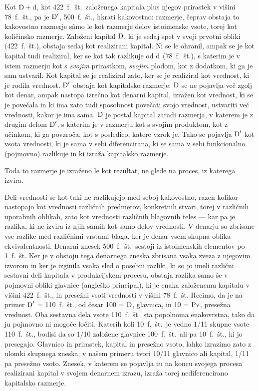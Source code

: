 \documentclass[kapital_02.tex]{subfiles}
\begin{document}
Kot \( \textrm{D} + \textrm{d} \), kot 422~f.~št.\ založenega kapitala plus njegov prirastek v višini 78~f.~št., pa je \( \textrm{D}' \), 500~f.~št., hkrati kakovostno: razmerje, čeprav obstaja to kakovostno razmerje s\^amo le kot razmerje delov istoimenske vsote, torej kot količinsko razmerje. Založeni kapital \( \textrm{D} \), ki je sedaj spet v svoji prvotni obliki (422~f.~št.), obstaja sedaj kot realizirani kapital. Ni se le ohranil, ampak se je kot kapital tudi realiziral, ker se kot tak razlikuje od \( \textrm{d} \) (78~f.~št.), s katerim je v istem razmerju kot s \emph{svojim} prirastkom, \emph{svojim} plodom, kot z dodatkom, ki ga je sam ustvaril. Kot kapital se je realiziral zato, ker se je realiziral kot vrednost, ki je rodila vrednost. \( \textrm{D}' \) obstaja kot kapitalsko razmerje: \( \textrm{D} \) se ne pojavlja več zgolj kot denar, ampak nastopa izrečno kot denarni kapital, izražen kot vrednost, ki se je povečala in ki ima zato tudi sposobnost povečati svojo vrednost, ustvariti več vrednosti, kakor je ima sama. \( \textrm{D} \) je postal kapital zaradi razmerja, v katerem je z drugim delom \( \textrm{D}' \), s katerim je v razmerju kot s svojim produktom, kot z učinkom, ki ga povzroča, kot s posledico, katere vzrok je. Tako se pojavlja \( \textrm{D}' \) kot vsota vrednosti, ki je sama v sebi diferencirana, ki se sama v sebi funkcionalno (pojmovno) razlikuje in ki izraža kapitalsko razmerje.

Toda to razmerje je izraženo le kot rezultat, ne glede na proces, iz katerega izvira.

Deli vrednosti se kot taki ne razlikujejo med seboj kakovostno, razen kolikor nastopajo kot vrednosti različnih predmetov, konkretnih stvari, torej v različnih uporabnih oblikah, zato kot vrednosti različnih blagovnih teles --- kar pa je razlika, ki ne izvira iz njih samih kot samo delov vrednosti. V denarju so zbrisane vse razlike med različnimi vrstami blaga, ker je denar vsem skupna oblika ekvivalentnosti. Denarni znesek 500~f.~št.\ sestoji iz istoimenskih elementov po 1~f.~št. Ker je v obstoju tega denarnega zneska zbrisana vsaka zveza z njegovim izvorom in ker je izginila vsaka sled o posebni razliki, ki so jo imeli različni sestavni deli kapitala v produkcijskem procesu, obstaja razlika samo še v pojmovni obliki glavnice (angleško principal), ki je enaka založenemu kapitalu v višini 422~f.~št., in presežni vsoti vrednosti v višini 78~f.~št. Recimo, da je na primer \( \textrm{D}' \) = 110~f.~št., od česar 100 = \( \textrm{D} \), glavnica, in 10 = \( \textrm{Pv} \), presežna vrednost. Oba sestavna dela vsote 110~f.~št.\ sta popolnoma enakovrstna, tako da ju pojmovno ni mogoče ločiti. Katerih koli 10~f.~št.\ je vedno 1/11 skupne vsote 110~f.~št., bodisi da so 1/10 založene glavnice 100~f.~št.\ ali pa 10~f.~št., ki jo presegajo. Glavnico in prirastek, kapital in presežno vsoto, lahko izrazimo zato z ulomki skupnega zneska; v našem primeru tvori 10/11 glavnico ali kapital, 1/11 pa presežno vsoto. Znesek, v katerem se pojavlja tu na koncu svojega procesa realizirani kapital v svojem denarnem izrazu, izraža torej nediferencirano kapitalsko razmerje.
\end{document}
